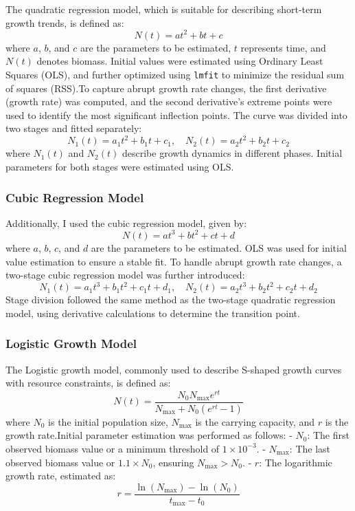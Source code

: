\documentclass[11pt]{article}
\begin{document}
The quadratic regression model, which is suitable for describing short-term growth trends, is defined as:
\[
N(t) = a t^2 + b t + c
\]
where \( a \), \( b \), and \( c \) are the parameters to be estimated, \( t \) represents time, and \( N(t) \) denotes biomass. Initial values were estimated using Ordinary Least Squares (OLS), and further optimized using \texttt{lmfit} to minimize the residual sum of squares (RSS).To capture abrupt growth rate changes, the first derivative (growth rate) was computed, and the second derivative's extreme points were used to identify the most significant inflection points. The curve was divided into two stages and fitted separately:
\[
N_1(t) = a_1 t^2 + b_1 t + c_1, \quad N_2(t) = a_2 t^2 + b_2 t + c_2
\]
where \( N_1(t) \) and \( N_2(t) \) describe growth dynamics in different phases. Initial parameters for both stages were estimated using OLS.

\subsubsection{Cubic Regression Model}

Additionally, I used the cubic regression model, given by:
\[
N(t) = a t^3 + b t^2 + c t + d
\]
where \( a \), \( b \), \( c \), and \( d \) are the parameters to be estimated. OLS was used for initial value estimation to ensure a stable fit. To handle abrupt growth rate changes, a two-stage cubic regression model was further introduced:
\[
N_1(t) = a_1 t^3 + b_1 t^2 + c_1 t + d_1, \quad N_2(t) = a_2 t^3 + b_2 t^2 + c_2 t + d_2
\]
Stage division followed the same method as the two-stage quadratic regression model, using derivative calculations to determine the transition point.

\subsubsection{Logistic Growth Model}

The Logistic growth model, commonly used to describe S-shaped growth curves with resource constraints, is defined as:
\[
N(t) = \frac{N_0 N_{\max} e^{r t}}{N_{\max} + N_0 (e^{r t} - 1)}
\]
where \( N_0 \) is the initial population size, \( N_{\max} \) is the carrying capacity, and \( r \) is the growth rate.Initial parameter estimation was performed as follows:
- \( N_0 \): The first observed biomass value or a minimum threshold of \( 1 \times 10^{-3} \).
- \( N_{\max} \): The last observed biomass value or \( 1.1 \times N_0 \), ensuring \( N_{\max} > N_0 \).
- \( r \): The logarithmic growth rate, estimated as:
  \[
  r = \frac{\ln(N_{\max}) - \ln(N_0)}{t_{\max} - t_0}
  \]
\end{document}
